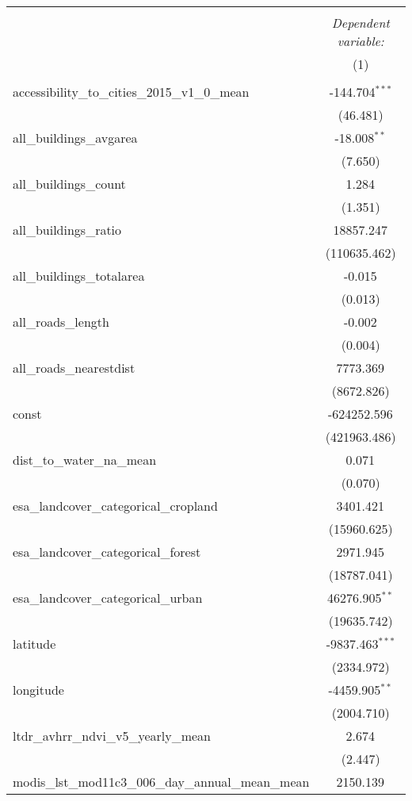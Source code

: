 \begin{table}[!htbp] \centering
\begin{tabular}{@{\extracolsep{5pt}}lc}
\\[-1.8ex]\hline
\hline \\[-1.8ex]
& \multicolumn{1}{c}{\textit{Dependent variable:}} \
\cr \cline{1-2}
\\[-1.8ex] & (1) \\
\hline \\[-1.8ex]
 accessibility_to_cities_2015_v1_0_mean & -144.704$^{***}$ \\
  & (46.481) \\
 all_buildings_avgarea & -18.008$^{**}$ \\
  & (7.650) \\
 all_buildings_count & 1.284$^{}$ \\
  & (1.351) \\
 all_buildings_ratio & 18857.247$^{}$ \\
  & (110635.462) \\
 all_buildings_totalarea & -0.015$^{}$ \\
  & (0.013) \\
 all_roads_length & -0.002$^{}$ \\
  & (0.004) \\
 all_roads_nearestdist & 7773.369$^{}$ \\
  & (8672.826) \\
 const & -624252.596$^{}$ \\
  & (421963.486) \\
 dist_to_water_na_mean & 0.071$^{}$ \\
  & (0.070) \\
 esa_landcover_categorical_cropland & 3401.421$^{}$ \\
  & (15960.625) \\
 esa_landcover_categorical_forest & 2971.945$^{}$ \\
  & (18787.041) \\
 esa_landcover_categorical_urban & 46276.905$^{**}$ \\
  & (19635.742) \\
 latitude & -9837.463$^{***}$ \\
  & (2334.972) \\
 longitude & -4459.905$^{**}$ \\
  & (2004.710) \\
 ltdr_avhrr_ndvi_v5_yearly_mean & 2.674$^{}$ \\
  & (2.447) \\
 modis_lst_mod11c3_006_day_annual_mean_mean & 2150.139$^{}$ \\

\end{tabular}
\end{table}
